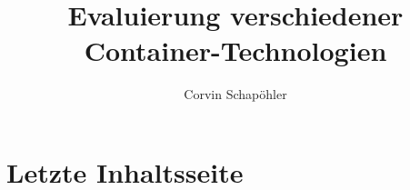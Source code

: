 

\title{Evaluierung verschiedener Container-Technologien}
\author{Corvin Schapöhler}


	
	
	
	
	\frontmatter
	\pagestyle{front}
	
%	
	

	\tableofcontents

	\mainmatter
	\pagestyle{main}
	
	
	\chapter{Letzte Inhaltsseite}
	
	\backmatter
	\pagestyle{back}
	
	
